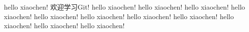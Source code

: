 hello xiaochen! 欢迎学习Git!
hello xiaochen!
hello xiaochen!
hello xiaochen!
hello xiaochen!
hello xiaochen!
hello xiaochen!
hello xiaochen!
hello xiaochen!
hello xiaochen!
hello xiaochen!
hello xiaochen!
